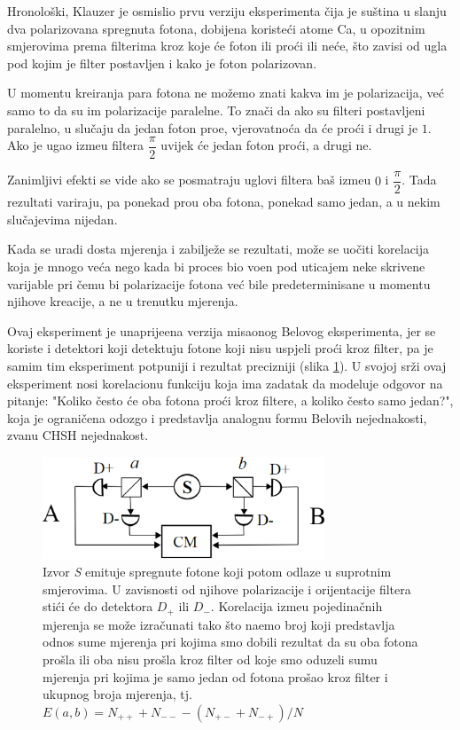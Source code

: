 Hronolo\v ski, Klauzer je osmislio prvu verziju eksperimenta \v cija je 
su\v stina u slanju dva polarizovana spregnuta fotona, dobijena koriste\' ci atome Ca, u opozitnim smjerovima prema filterima kroz koje
\' ce foton ili pro\' ci ili ne\' ce, \v sto zavisi od ugla pod kojim je filter postavljen
i kako je foton polarizovan.

U momentu kreiranja para fotona ne mo\v zemo znati kakva im je polarizacija, ve\' c samo to da su im
polarizacije paralelne. To zna\v ci da ako su filteri postavljeni paralelno, u slu\v caju da jedan foton pro\dj e, vjerovatno\' ca da \' ce pro\' ci i drugi je $1$.
Ako je ugao izme\dj u filtera $\dfrac{\pi}{2}$ uvijek \' ce jedan foton pro\' ci, a drugi ne.

Zanimljivi efekti se vide ako se posmatraju uglovi filtera ba\v s izme\dj u $0$ i $\dfrac{\pi}{2}$. Tada rezultati variraju,
pa ponekad pro\dj u oba fotona, ponekad samo jedan, a u nekim slu\v cajevima nijedan.

Kada se uradi dosta mjerenja i zabilje\v ze se rezultati, mo\v ze se uo\v citi korelacija koja je mnogo ve\'ca nego kada bi
proces bio vo\dj en pod uticajem neke skrivene varijable pri \v cemu bi polarizacije fotona ve\'c bile predeterminisane u momentu njihove kreacije, a ne u trenutku mjerenja.

Ovaj eksperiment je unaprije\dj ena verzija misaonog Belovog eksperimenta, jer se koriste i detektori koji
detektuju fotone koji nisu uspjeli pro\'ci kroz filter, pa je samim tim eksperiment potpuniji i rezultat precizniji (slika \ref{fig:chsh_scheme}).
U svojoj sr\v zi ovaj eksperiment nosi korelacionu funkciju koja ima zadatak da modeluje odgovor na pitanje: "Koliko
\v cesto \'ce oba fotona pro\' ci kroz filtere, a koliko \v cesto samo jedan?", koja je ograni\v cena odozgo i predstavlja analognu formu
Belovih nejednakosti, zvanu CHSH nejednakost.

\begin{figure}
    \centering
    \includegraphics[width=0.75\textwidth]{figures/chsh_scheme.eps}
    \caption{Izvor \textit{S} emituje spregnute fotone koji potom odlaze u suprotnim smjerovima. U zavisnosti od njihove polarizacije i orijentacije filtera sti\'ci \' ce do  detektora $D_+$ ili $D_-$.
    Korelacija izme\dj u pojedina\v cnih mjerenja se mo\v ze izra\v cunati tako \v sto
    na\dj emo broj koji predstavlja odnos sume mjerenja pri kojima smo dobili rezultat da su oba fotona pro\v sla ili oba nisu pro\v sla kroz filter
    od koje smo oduzeli sumu mjerenja pri kojima je samo jedan od fotona pro\v sao kroz filter i ukupnog broja mjerenja, tj.
       $E(a,b) = N_{++} + N_{--} - (N_{+-} + N_{-+})/N$}
    \label{fig:chsh_scheme}
\end{figure}

